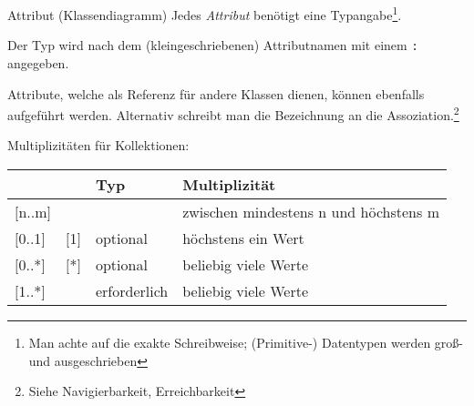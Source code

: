 \begin{diag}{Attribut (Klassendiagramm)}
    Jedes \emph{Attribut} benötigt eine Typangabe\footnote{Man achte auf die exakte Schreibweise; (Primitive-) Datentypen werden groß- und ausgeschrieben}.

    Der Typ wird nach dem (kleingeschriebenen) Attributnamen mit einem \texttt{:} angegeben.

    Attribute, welche als Referenz für andere Klassen dienen, können ebenfalls aufgeführt werden.
    Alternativ schreibt man die Bezeichnung an die Assoziation.\footnote{Siehe Navigierbarkeit, Erreichbarkeit}

    Multiplizitäten für Kollektionen:

    \begin{tabular}{>{\ttfamily}l>{\ttfamily}lll}
        \multicolumn{1}{l}{Symbol} & \multicolumn{1}{l}{alternativ} & Typ          & {Multiplizität}                       \\
        \hline
        $[$n..m$]$                 &                                &              & zwischen mindestens n und höchstens m \\
        $[$0..1$]$                 & $[$1$]$                        & optional     & höchstens ein Wert                    \\
        $[$0..*$]$                 & $[$*$]$                        & optional     & beliebig viele Werte                  \\
        $[$1..*$]$                 &                                & erforderlich & beliebig viele Werte
    \end{tabular}
\end{diag}

